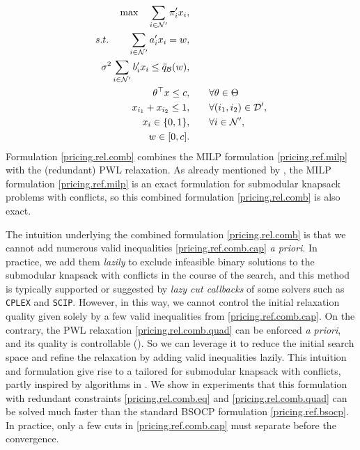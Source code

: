 \begin{subequations}
\label{pricing.rel.comb}
\begin{align}
  	 \max \quad \sum_{i\in \mathcal N'} \pi'_i x_i, \qquad& \\
    s.t. \qquad  \sum_{i \in \mathcal N'} a'_i x_i = w, \qquad & \label{pricing.rel.comb.eq} \\
    \sigma^2\sum_{i \in \mathcal N'} b'_i x_i  \le  \bar{q}_{\mathcal B}(w),\qquad& \label{pricing.rel.comb.quad}\\
    \qquad \theta ^\top  x\le c,\qquad & \forall \theta \in \Theta \label{pricing.ref.comb.cap}\\
    x_{i_1} + x_{i_2} \le 1, \qquad & \forall (i_1, i_2) \in \mathcal D', \\
    x_i \in \{0,1\},\qquad & \forall  i  \in \mathcal N', \\
    w \in [0,c].\qquad &
\end{align}
\end{subequations}
Formulation \eqref{pricing.rel.comb} combines the MILP formulation \eqref{pricing.ref.milp} with the (redundant) PWL relaxation. As already mentioned by , the MILP formulation \eqref{pricing.ref.milp} is an exact formulation for submodular knapsack problems with conflicts, so this combined formulation \eqref{pricing.rel.comb} is also exact.

The intuition underlying the combined formulation \eqref{pricing.rel.comb} is that we cannot add numerous valid inequalities \eqref{pricing.ref.comb.cap} \textit{a priori}. In practice, we add them \textit{lazily} to exclude infeasible binary solutions to the submodular knapsack with conflicts in the course of the search, and this method is typically supported or suggested by \textit{lazy cut callbacks} of some solvers such as \texttt{CPLEX} and \texttt{SCIP}. However, in this way,  we cannot control the initial relaxation quality given solely by a few  valid inequalities from \eqref{pricing.ref.comb.cap}. On the contrary, the PWL relaxation \eqref{pricing.rel.comb.quad} can be enforced \textit{a priori}, and its quality is controllable (). So we can leverage it to reduce the initial search space and refine the relaxation by adding valid inequalities lazily. This intuition and formulation give rise to a tailored  for submodular knapsack with conflicts, partly inspired by algorithms in \cite{coey2018outer}. We show in experiments that this formulation with redundant constraints \eqref{pricing.rel.comb.eq} and \eqref{pricing.rel.comb.quad} can be solved much faster than the standard BSOCP formulation \eqref{pricing.ref.bsocp}. In practice, only a few cuts in \eqref{pricing.ref.comb.cap} must separate before the convergence.



